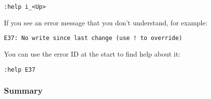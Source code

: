  \begin{Verbatim}[samepage=true]
 :help i_<Up>
 \end{Verbatim}

If you see an error message that you don't understand, for example:

	\begin{Verbatim}[samepage=true]
  E37: No write since last change (use ! to override) 
	\end{Verbatim}

You can use the error ID at the start to find help about it:

 \begin{Verbatim}[samepage=true]
 :help E37
 \end{Verbatim}

\subsubsection{Summary}
\label{help-summary}
